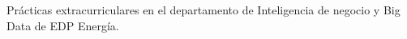 {%
	\par{\small Prácticas extracurriculares en el departamento de Inteligencia de negocio y Big Data de EDP Energía. 
 }

}

\clearpage